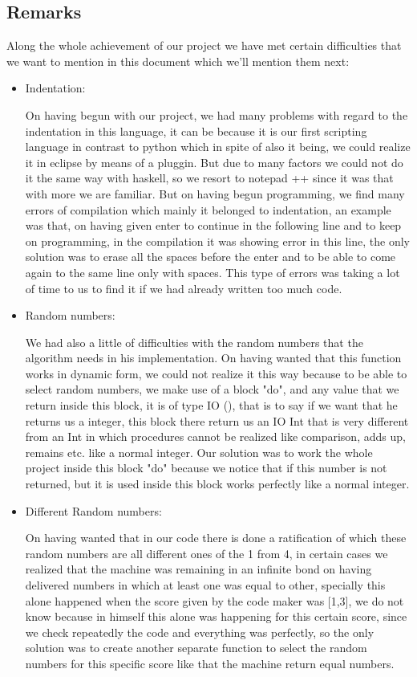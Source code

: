 \documentclass[12pt,letterpaper]{article}
\begin{document}
\newpage
\subsection{Remarks}
  Along the whole achievement of our project we have met certain difficulties that we want to mention in this document which we'll mention them next:

 \begin{itemize}
   \item Indentation:
   
   On having begun with our project, we had many problems with regard to the indentation in this language, it can be because it is our first scripting language in contrast to python which in spite of also it being, we could realize it in eclipse by means of a pluggin.
   But due to many factors we could not do it the same way with haskell, so we resort to notepad ++ since it was that with more we are familiar. But on having begun programming, we find many errors of compilation which mainly it belonged to indentation, an example was that, on having given enter to continue in the following line and to keep on programming, in the compilation it was showing error in this line, the only solution was to erase all the spaces before the enter and to be able to come again to the same line only with spaces. This type of errors was taking a lot of time to us to find it if we had already written too much code. 

\item Random numbers:
   
  We had also a little of difficulties with the random numbers that the algorithm needs in his implementation. On having wanted that this function works in dynamic form, we could not realize it this way because to be able to select random numbers, we make use of a block "do", and any value that we return inside this block, it is of type IO (), that is to say if we want that he returns us a integer, this block there return us an IO Int that is very different from an Int in which procedures cannot be realized like comparison, adds up, remains etc. like a normal integer. Our solution was to work the whole project inside this block "do" because we notice that if this number is not returned, but it is used inside this block works perfectly like a normal integer.

\item Different Random numbers:
   
  On having wanted that in our code there is done a ratification of which these random numbers are all different ones of the 1 from 4, in certain cases we realized that the machine was remaining in an infinite bond on having delivered numbers in which at least one was equal to other, specially this alone happened when the score given by the code maker was [1,3], we do not know because in himself this alone was happening for this certain score, since we check repeatedly the code and everything was perfectly, so the only solution was to create another separate function to select the random numbers for this specific score like that the machine return equal numbers.


\end{itemize}
\end{document}
